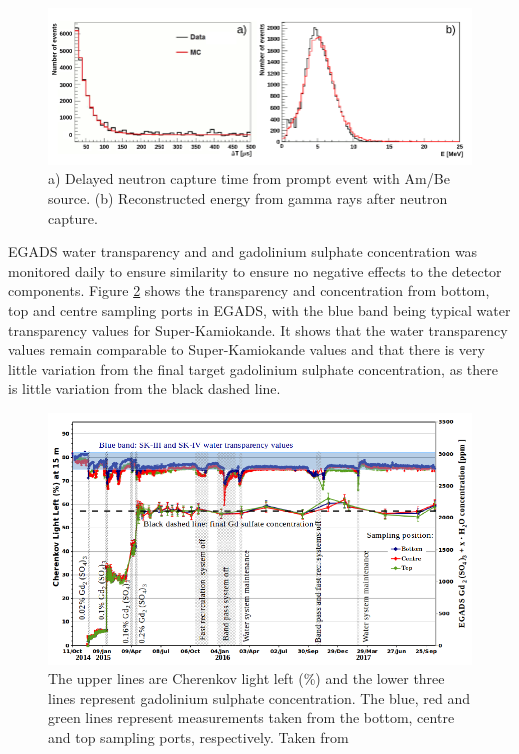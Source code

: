 \begin{figure}[H]
    \includegraphics[width=\textwidth]{Figures/egads_ambe.png}
\caption{a) Delayed neutron capture time from prompt event with Am/Be source. (b) Reconstructed energy from gamma rays after neutron capture.}
\label{fig:EGADS_ambe_capture}
\end{figure}

EGADS water transparency and and gadolinium sulphate concentration was monitored daily to ensure similarity to ensure no negative effects to the detector components. Figure \ref{fig:egads_transparency} shows the transparency and concentration from bottom, top and centre sampling ports in EGADS, with the blue band being typical water transparency values for Super-Kamiokande. It shows that the water transparency values remain comparable to Super-Kamiokande values and that there is very little variation from the final target gadolinium sulphate concentration, as there is little variation from the black dashed line. 

\begin{figure}[H]
\includegraphics[width=\textwidth]{Figures/egads_concentration.png}
\caption{The upper lines are Cherenkov light left (\%) and the lower three lines represent gadolinium sulphate concentration. The blue, red and green lines represent measurements taken from the bottom, centre and top sampling ports, respectively. Taken from \cite{martiEvaluationGadoliniumAction2020a}}
\label{fig:egads_transparency}
\end{figure}

